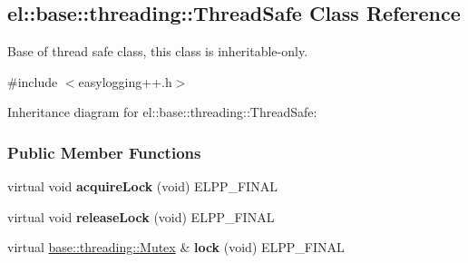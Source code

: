 \hypertarget{a00091}{}\subsection{el\+:\+:base\+:\+:threading\+:\+:Thread\+Safe Class Reference}
\label{a00091}


Base of thread safe class, this class is inheritable-\/only.  




{\ttfamily \#include $<$easylogging++.\+h$>$}



Inheritance diagram for el\+:\+:base\+:\+:threading\+:\+:Thread\+Safe\+:
\subsubsection*{Public Member Functions}
\begin{DoxyCompactItemize}
\item 
\hypertarget{a00091_a59db719b214f7118f0919846a85077bf}{}virtual void {\bfseries acquire\+Lock} (void) E\+L\+P\+P\+\_\+\+F\+I\+N\+A\+L\label{a00091_a59db719b214f7118f0919846a85077bf}

\item 
\hypertarget{a00091_a95bb166242b9691f861274a9b8ced2d9}{}virtual void {\bfseries release\+Lock} (void) E\+L\+P\+P\+\_\+\+F\+I\+N\+A\+L\label{a00091_a95bb166242b9691f861274a9b8ced2d9}

\item 
\hypertarget{a00091_affb45b35790a7305d0a659562c8104fc}{}virtual \hyperlink{a00060}{base\+::threading\+::\+Mutex} \& {\bfseries lock} (void) E\+L\+P\+P\+\_\+\+F\+I\+N\+A\+L\label{a00091_affb45b35790a7305d0a659562c8104fc}

\end{DoxyCompactItemize}
